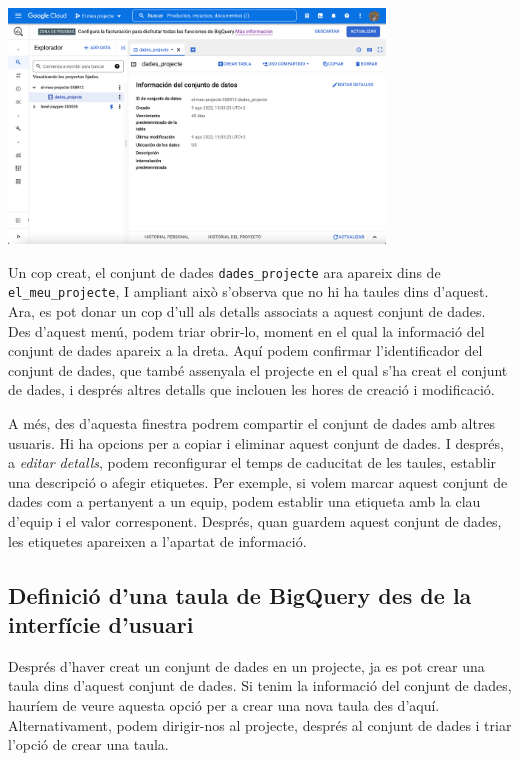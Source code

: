 \documentclass[12pt,longbibliography]{article}
\theoremstyle{definition}
\theoremstyle{remark}
\begin{document}
\vspace{2mm}

\begin{center}
\includegraphics[width=10cm]{bq5}
\end{center}

\vspace{2mm}

Un cop creat, el conjunt de dades \verb|dades_projecte| ara apareix dins de \verb|el_meu_projecte|, I ampliant això s'observa que no hi ha taules dins d'aquest. Ara, es pot donar un cop d'ull als detalls associats a aquest conjunt de dades. Des d'aquest menú, podem triar obrir-lo, moment en el qual la informació del conjunt de dades apareix a la dreta. Aquí podem confirmar l'identificador del conjunt de dades, que també assenyala el projecte en el qual s'ha creat el conjunt de dades, i després altres detalls que inclouen les hores de creació i modificació. 

\vspace{2mm}

A més, des d'aquesta finestra podrem compartir el conjunt de dades amb altres usuaris. Hi ha opcions per a copiar i eliminar aquest conjunt de dades. I després, a \textit{editar detalls}, podem reconfigurar el temps de caducitat de les taules, establir una descripció o afegir etiquetes. Per exemple, si volem marcar aquest conjunt de dades com a pertanyent a un equip, podem establir una etiqueta amb la clau d'equip i el valor corresponent. Després, quan guardem aquest conjunt de dades, les etiquetes apareixen a l'apartat de informació.

\subsection{Definició d'una taula de BigQuery des de la interfície d'usuari}

Després d'haver creat un conjunt de dades en un projecte, ja es pot crear una taula dins d'aquest conjunt de dades. Si tenim la informació del conjunt de dades, hauríem de veure aquesta opció per a crear una nova taula des d'aquí. Alternativament, podem dirigir-nos al projecte, després al conjunt de dades i triar l'opció de crear una taula.
\end{document}
